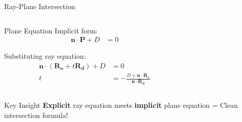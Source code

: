 \begin{frame}{Ray-Plane Intersection}
    \begin{columns}
        \begin{column}{0.5\textwidth}
            \begin{mathbox}{Plane Equation}
                Implicit form:
                \begin{align}
                    \mathbf{n} \cdot \mathbf{P} + D &= 0
                \end{align}
                
                Substituting ray equation:
                \begin{align}
                    \mathbf{n} \cdot (\mathbf{R_o} + t\mathbf{R_d}) + D &= 0\\
                    t &= -\frac{D + \mathbf{n} \cdot \mathbf{R_o}}{\mathbf{n} \cdot \mathbf{R_d}}
                \end{align}
            \end{mathbox}
        \end{column}
        \begin{column}{0.5\textwidth}
        \end{column}
    \end{columns}
    
    \begin{conceptbox}{Key Insight}
        \textbf{Explicit} ray equation meets \textbf{implicit} plane equation = Clean intersection formula!
    \end{conceptbox}
\end{frame}

